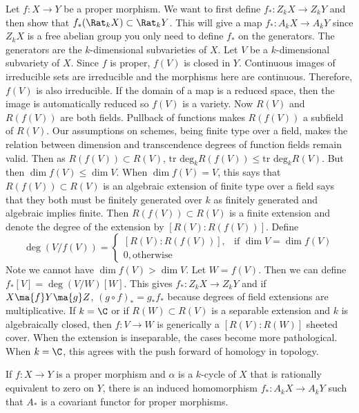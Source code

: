 Let $f: X \to Y$ be a proper morphism. We want to first define $f_*: Z_k X \to Z_k Y$ and then show that $f_*(\Rat_k X) \subset \Rat_k Y$. This will give a map $f_*: A_k X \to A_k Y$ since $Z_kX$ is a free abelian group you only need to define $f_*$ on the generators. The generators are the $k$-dimensional subvarieties of $X$. Let $V$ be a $k$-dimensional subvariety of $X$. Since $f$ is proper, $f(V)$ is closed in $Y$. Continuous images of irreducible sets are irreducible and the morphisms here are continuous. Therefore, $f(V)$ is also irreducible. If the domain of a map is a reduced space, then the image is automatically reduced so $f(V)$ is a variety. Now $R(V)$ and $R(f(V))$ are both fields. Pullback of functions makes $R(f(V))$ a subfield of $R(V)$. Our assumptions on schemes, being finite type over a field, makes the relation between dimension and transcendence degrees of function fields remain valid. Then as $R(f(V)) \subset R(V)$, $\text{tr deg}_kR(f(V)) \leq \text{tr deg}_kR(V)$. But then $\dim f(V) \leq \dim V$. When $\dim f(V)=V$, this says that $R(f(V)) \subset R(V)$ is an algebraic extension of finite type over a field says that they both must be finitely generated over $k$ as finitely generated and algebraic implies finite. Then $R(f(V)) \subset R(V)$ is a finite extension and denote the degree of the extension by $[R(V):R(f(V))]$. Define
	\[
	\deg(V/f(V))=
	\begin{cases}
	[R(V):R(f(V))], & \text{if } \dim V=\dim f(V) \\
	0, \text{otherwise}
	\end{cases}
	\]
Note we cannot have $\dim f(V) > \dim V$. Let $W=f(V)$. Then we can define $f_*[V]= \deg(V/W)[W]$. This gives $f_*: Z_k X \to Z_k Y$ and if $X \ma{f} Y \ma{g} Z$, $(g \circ f)_*=g_*f_*$ because degrees of field extensions are multiplicative. If $k=\C$ or if $R(W) \subset R(V)$ is a separable extension and $k$ is algebraically closed, then $f: V \to W$ is generically a $[R(V):R(W)]$ sheeted cover. When the extension is inseparable, the cases become more pathological. When $k=\C$, this agrees with the push forward of homology in topology. 


\begin{thmm}\label{thm:ratequiv}
If $f: X \to Y$ is a proper morphism and $\alpha$ is a $k$-cycle of $X$ that is rationally equivalent to zero on $Y$, there is an induced homomorphism $f_*: A_k X \to A_k Y$ such that $A_*$ is a covariant functor for proper morphisms. 
\end{thmm}


